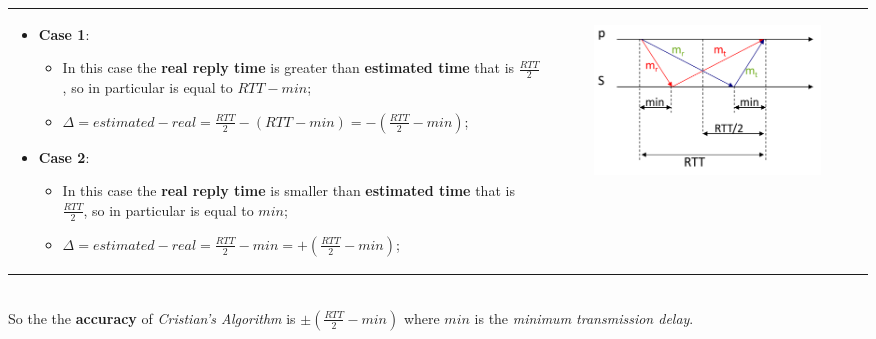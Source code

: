 \documentclass{article}
\begin{document}
\begin{tabular}{C{11cm}  L{1cm}}
\begin{itemize}[leftmargin=*]
\item \textbf{Case 1}:
\begin{itemize}
\item In this case the \textbf{real reply time} is greater than \textbf{estimated time} that is $\frac{RTT}{2}$, so in particular is equal to $RTT - min$;
\item $\Delta = estimated - real = \frac{RTT}{2} - (RTT-min) = -(\frac{RTT}{2}-min)$;
\end{itemize}
\item \textbf{Case 2}:
\begin{itemize}
\item In this case the \textbf{real reply time} is smaller than \textbf{estimated time} that is $\frac{RTT}{2}$, so in particular is equal to $min$;
\item $\Delta = estimated - real = \frac{RTT}{2} - min = +(\frac{RTT}{2}-min)$;
\end{itemize} 
\end{itemize} &
\begin{figure}[H]
  \includegraphics[scale=0.5]{cattura13.png}
\end{figure}
\end{tabular}\\
So the the \textbf{accuracy} of \emph{Cristian's Algorithm} is $\pm (\frac{RTT}{2}-min)$ where $min$ is the \emph{minimum transmission delay}.
\end{document}
